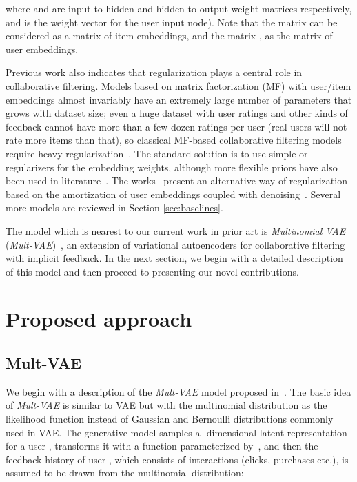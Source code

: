 \documentclass[sigconf,authorversion]{acmart}
\begin{document}
where  and  are input-to-hidden and hidden-to-output weight matrices respectively, and  is the weight vector for the user input node). Note that the matrix  can be considered as a matrix of item embeddings, and the matrix , as the matrix of user embeddings.

Previous work also indicates that regularization plays a central role in collaborative filtering. Models based on matrix factorization (MF) with user/item embeddings almost invariably have an extremely large number of parameters that grows with dataset size; even a huge dataset with user ratings and other kinds of feedback cannot have more than a few dozen ratings per user (real users will not rate more items than that), so classical MF-based collaborative filtering models require heavy regularization~\cite{Park:2012:LRC:2181339.2181690,bell2007scalable,Adomavicius:2005:TNG:1070611.1070751}. The standard solution is to use simple  or  regularizers for the embedding weights, although more flexible priors have also been used in literature~\cite{salakhutdinov2008bayesian,lawrence2009non}. The works~\cite{wu2016collaborative,liang2018variational} present an alternative way of regularization based on the amortization of user embeddings coupled with denoising~\cite{vincent2010stacked,im2017denoising,shu2018amortized}. Several more models are reviewed in Section \ref{sec:baselines}.

The model which is nearest to our current work in prior art is \emph{Multinomial VAE} (\emph{Mult-VAE})~\cite{liang2018variational}, an extension of variational autoencoders for collaborative filtering with implicit feedback. In the next section, we begin with a detailed description of this model and then proceed to presenting our novel contributions.


\section{Proposed approach}\label{sec:method}

\subsection{Mult-VAE}\label{sec:mult}

We begin with a description of the \emph{Mult-VAE} model proposed in~\cite{liang2018variational}. The basic idea of \emph{Mult-VAE} is similar to VAE but with the multinomial distribution as the likelihood function instead of Gaussian and Bernoulli distributions commonly used in VAE. The generative model samples a -dimensional latent representation  for a user , transforms it with a function  parameterized by~, and then the feedback history  of user , which consists of  interactions (clicks, purchases etc.), is assumed to be drawn from the multinomial distribution:
\end{document}
